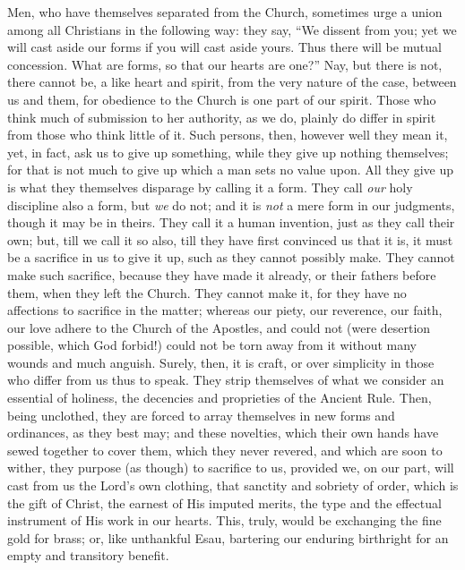 Men, who have themselves separated from the Church, sometimes urge
a union among all Christians in the following way: they say, ``We
dissent from you; yet we will cast aside our forms if you will cast
aside yours. Thus there will be mutual concession. What are forms, so
that our hearts are one?'' Nay, but there is not, there cannot be,
a like heart and spirit, from the very nature of the case, between us
and them, for obedience to the Church is one part of our spirit. Those
who think much of submission to her authority, as we do, plainly do
differ in spirit from those who think little of it. Such persons,
then, however well they mean it, yet, in fact, ask us to give up
something, while they give up nothing themselves; for that is not much
to give up which a man sets no value upon. All they give up is what
they themselves disparage by calling it a form. They call \emph{our}
holy discipline also a form, but \emph{we} do not; and it is \emph{not}
a mere form in our judgments, though it may be in theirs. They call it
a human invention, just as they call their own; but, till we call it
so also, till they have first convinced us that it is, it must be a
sacrifice in us to give it up, such as they cannot possibly make. They
cannot make such sacrifice, because they have made it already, or
their fathers before them, when they left the Church. They cannot make
it, for they have no affections to sacrifice in the matter; whereas
our piety, our reverence, our faith, our love adhere to the Church of
the Apostles, and could not (were desertion possible, which God
forbid!) could not be torn away from it without many wounds and much
anguish. Surely, then, it is craft, or over simplicity in those who
differ from us thus to speak. They strip themselves of what we
consider an essential of holiness, the decencies and proprieties of
the Ancient Rule. Then, being unclothed, they are forced to array
themselves in new forms and ordinances, as they best may; and these
novelties, which their own hands have sewed together to cover them,
which they never revered, and which are soon to wither, they purpose
(as though) to sacrifice to us, provided we, on our part, will cast
from us the Lord's own clothing, that sanctity and sobriety of
order, which is the gift of Christ, the earnest of His imputed merits,
the type and the effectual instrument of His work in our hearts. This,
truly, would be exchanging the fine gold for brass; or, like
unthankful Esau, bartering our enduring birthright for an empty and
transitory benefit.

